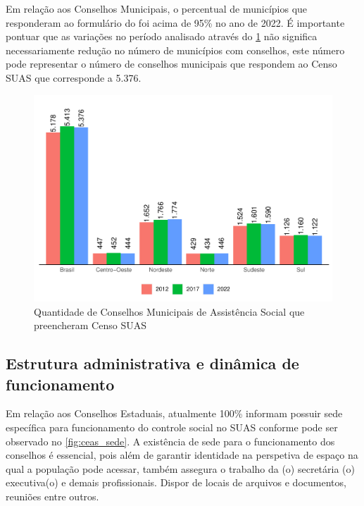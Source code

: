 \documentclass[
  brazilian]{report}
\begin{document}
Em relação aos Conselhos Municipais, o percentual de municípios que
responderam ao formulário do foi acima de 95\% no ano de 2022. É
importante pontuar que as variações no período analisado através do
\cref{fig:qtd-cmas} não significa necessariamente redução no número de
municípios com conselhos, este número pode representar o número de
conselhos municipais que respondem ao Censo SUAS que corresponde a
5.376.

\begin{figure}
\includegraphics{Censo-SUAS-2022_files/figure-latex/qtd-cmas-1} \caption[Quantidade de Conselhos Municipais de Assistência Social que preencheram Censo SUAS]{Quantidade de Conselhos Municipais de Assistência Social que preencheram Censo SUAS}\label{fig:qtd-cmas}
\end{figure}

\hypertarget{estrutura-administrativa-e-dinuxe2mica-de-funcionamento}{%
\subsection{Estrutura administrativa e dinâmica de
funcionamento}\label{estrutura-administrativa-e-dinuxe2mica-de-funcionamento}}

Em relação aos Conselhos Estaduais, atualmente 100\% informam possuir
sede específica para funcionamento do controle social no SUAS conforme
pode ser observado no \cref{fig:ceas_sede}. A existência de sede para o
funcionamento dos conselhos é essencial, pois além de garantir
identidade na perspetiva de espaço na qual a população pode acessar,
também assegura o trabalho da (o) secretária (o) executiva(o) e demais
profissionais. Dispor de locais de arquivos e documentos, reuniões entre
outros.
\end{document}
